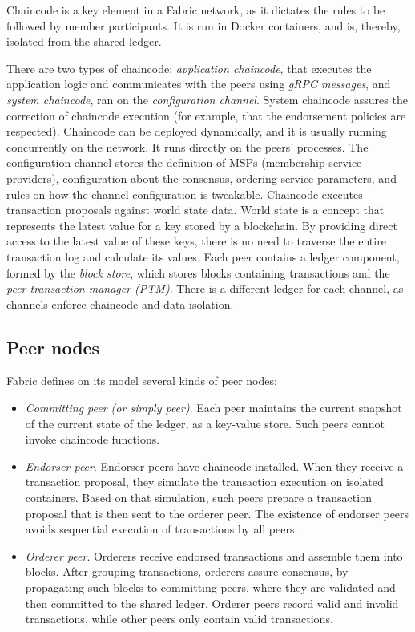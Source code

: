 \documentclass[12pt,a4paper]{article}
\theoremstyle{definition}
\begin{document}
Chaincode is a key element in a Fabric network, as it dictates the rules to be followed by member participants. It is run in Docker containers, and is, thereby, isolated from the shared ledger.

There are two types of chaincode: \emph{application chaincode}, that executes the application logic and communicates with the peers using \textit{gRPC messages}, and \emph{system chaincode}, ran on the \textit{configuration channel}. System chaincode assures the correction of chaincode execution (for example, that the endorsement policies are respected). Chaincode can be deployed dynamically, and it is usually  running concurrently on the network.  It runs directly on the peers' processes. The configuration channel stores the definition of MSPs (membership service providers), configuration about the consensus, ordering service parameters, and rules on how the channel configuration is tweakable. Chaincode executes transaction proposals against world state data. World state is a concept that represents the latest value for a key stored by a blockchain. By providing direct access to the latest value of these keys, there is no need to traverse the entire transaction log and calculate its values. Each peer contains a ledger component, formed by the \textit{block store}, which stores blocks containing transactions and the \textit{peer transaction manager (PTM)}. There is a different ledger for each channel, as channels enforce chaincode and data isolation.


\subsection{Peer nodes}
Fabric defines on its model several kinds of peer nodes:
\begin{itemize}
    \item \emph{Committing peer (or simply peer)}. Each peer maintains the current snapshot of the current state of the ledger, as a key-value store. Such peers cannot invoke chaincode functions. 
    \item \emph{Endorser peer}. Endorser peers have chaincode installed. When they receive a transaction proposal, they simulate the transaction execution on isolated containers. Based on that simulation, such peers prepare a transaction proposal that is then sent to the orderer peer. The existence of endorser peers avoids sequential execution of transactions by all peers.
    \item \emph{Orderer peer}. Orderers receive endorsed transactions and assemble them into blocks. After grouping transactions, orderers assure consensus, by propagating such blocks to committing peers, where they are validated and then committed to the shared ledger. Orderer peers record valid and invalid transactions, while other peers only contain valid transactions.
    
\end{itemize}
\end{document}

